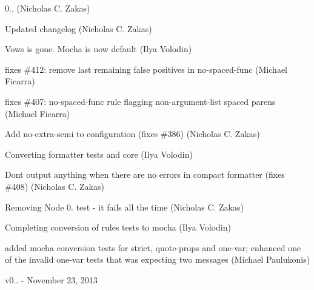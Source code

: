 \begin{DoxyItemize}
\item 0.. (Nicholas C. Zakas)
\item Updated changelog (Nicholas C. Zakas)
\item Vows is gone. Mocha is now default (Ilya Volodin)
\item fixes \#412\+: remove last remaining false positives in no-\/spaced-\/func (Michael Ficarra)
\item fixes \#407\+: no-\/spaced-\/func rule flagging non-\/argument-\/list spaced parens (Michael Ficarra)
\item Add no-\/extra-\/semi to configuration (fixes \#386) (Nicholas C. Zakas)
\item Converting formatter tests and core (Ilya Volodin)
\item Don\textquotesingle{}t output anything when there are no errors in compact formatter (fixes \#408) (Nicholas C. Zakas)
\item Removing Node 0. test -\/ it fails all the time (Nicholas C. Zakas)
\item Completing conversion of rule\textquotesingle{}s tests to mocha (Ilya Volodin)
\item added mocha conversion tests for strict, quote-\/props and one-\/var; enhanced one of the invalid one-\/var tests that was expecting two messages (Michael Paulukonis)
\end{DoxyItemize}

v0.. -\/ November 23, 2013


